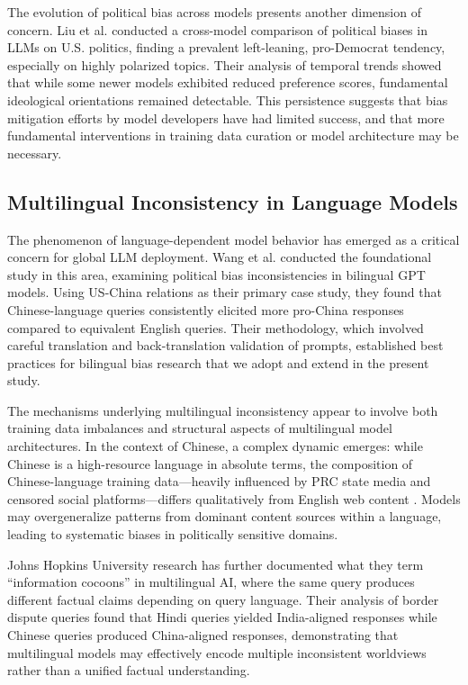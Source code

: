 \documentclass[11pt,a4paper]{article}
\begin{document}
The evolution of political bias across models presents another dimension of concern. Liu et al. \citep{liu2024temporal} conducted a cross-model comparison of political biases in LLMs on U.S. politics, finding a prevalent left-leaning, pro-Democrat tendency, especially on highly polarized topics. Their analysis of temporal trends showed that while some newer models exhibited reduced preference scores, fundamental ideological orientations remained detectable. This persistence suggests that bias mitigation efforts by model developers have had limited success, and that more fundamental interventions in training data curation or model architecture may be necessary.

\subsection{Multilingual Inconsistency in Language Models}

The phenomenon of language-dependent model behavior has emerged as a critical concern for global LLM deployment. Wang et al. \citep{wang2024nyu} conducted the foundational study in this area, examining political bias inconsistencies in bilingual GPT models. Using US-China relations as their primary case study, they found that Chinese-language queries consistently elicited more pro-China responses compared to equivalent English queries. Their methodology, which involved careful translation and back-translation validation of prompts, established best practices for bilingual bias research that we adopt and extend in the present study.

The mechanisms underlying multilingual inconsistency appear to involve both training data imbalances and structural aspects of multilingual model architectures. In the context of Chinese, a complex dynamic emerges: while Chinese is a high-resource language in absolute terms, the composition of Chinese-language training data---heavily influenced by PRC state media and censored social platforms---differs qualitatively from English web content \citep{xu2024censorship}. Models may overgeneralize patterns from dominant content sources within a language, leading to systematic biases in politically sensitive domains.

Johns Hopkins University research \citep{jhu2025multilingual} has further documented what they term ``information cocoons'' in multilingual AI, where the same query produces different factual claims depending on query language. Their analysis of border dispute queries found that Hindi queries yielded India-aligned responses while Chinese queries produced China-aligned responses, demonstrating that multilingual models may effectively encode multiple inconsistent worldviews rather than a unified factual understanding.
\end{document}
